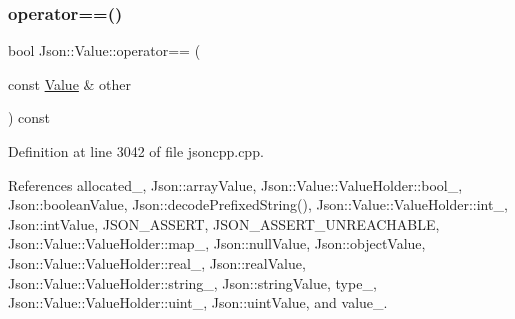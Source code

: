 \subsubsection{\texorpdfstring{operator==()}{operator==()}}
{\footnotesize\ttfamily bool Json\+::\+Value\+::operator== (\begin{DoxyParamCaption}\item[{const \hyperlink{class_json_1_1_value}{Value} \&}]{other }\end{DoxyParamCaption}) const}



Definition at line 3042 of file jsoncpp.\+cpp.



References allocated\+\_\+, Json\+::array\+Value, Json\+::\+Value\+::\+Value\+Holder\+::bool\+\_\+, Json\+::boolean\+Value, Json\+::decode\+Prefixed\+String(), Json\+::\+Value\+::\+Value\+Holder\+::int\+\_\+, Json\+::int\+Value, J\+S\+O\+N\+\_\+\+A\+S\+S\+E\+RT, J\+S\+O\+N\+\_\+\+A\+S\+S\+E\+R\+T\+\_\+\+U\+N\+R\+E\+A\+C\+H\+A\+B\+LE, Json\+::\+Value\+::\+Value\+Holder\+::map\+\_\+, Json\+::null\+Value, Json\+::object\+Value, Json\+::\+Value\+::\+Value\+Holder\+::real\+\_\+, Json\+::real\+Value, Json\+::\+Value\+::\+Value\+Holder\+::string\+\_\+, Json\+::string\+Value, type\+\_\+, Json\+::\+Value\+::\+Value\+Holder\+::uint\+\_\+, Json\+::uint\+Value, and value\+\_\+.


